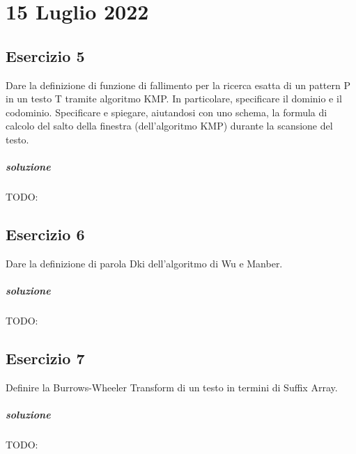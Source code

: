 \chapter{15 Luglio 2022}

\section{Esercizio 5}

Dare la definizione di funzione di fallimento per la ricerca esatta di un pattern P in un testo T tramite algoritmo KMP. In particolare, specificare il dominio e il codominio.
Specificare e spiegare, aiutandosi con uno schema, la formula di calcolo del salto della finestra (dell'algoritmo KMP) durante la scansione del testo.

\paragraph{soluzione} TODO:

\section{Esercizio 6}

Dare la definizione di parola Dki dell'algoritmo di Wu e Manber.

\paragraph{soluzione} TODO:

\section{Esercizio 7}

Definire la Burrows-Wheeler Transform di un testo in termini di Suffix Array.

\paragraph{soluzione} TODO:
